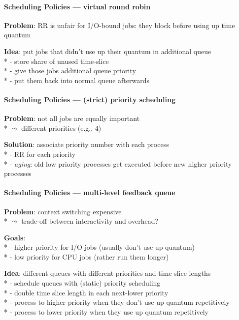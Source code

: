 \paragraph{Scheduling Policies --- virtual round robin}
\begin{items}
  \item \textbf{Problem}: RR is unfair for I/O-bound jobs: they block before using up time quantum
  \item \textbf{Idea}: put jobs that didn't use up their quantum in additional queue \\*
    - store share of unused time-slice \\*
    - give those jobs additional queue priority \\*
    - put them back into normal queue afterwards
\end{items}

\paragraph{Scheduling Policies --- (strict) priority scheduling}
\begin{items}
  \item \textbf{Problem}: not all jobs are equally important \\*
    \( \leadsto \) different priorities (e.g., 4)
  \item \textbf{Solution}: associate priority number with each process \\*
    - RR for each priority \\*
    - \emph{aging}: old low priority processes get executed before new higher priority processes
\end{items}

\paragraph{Scheduling Policies --- multi-level feedback queue}
\begin{items}
  \item \textbf{Problem}: context switching expensive \\*
    \( \leadsto \) trade-off between interactivity and overhead?
  \item \textbf{Goals}: \\*
    - higher priority for I/O jobs (usually don't use up quantum) \\*
    - low priority for CPU jobs (rather run them longer)
  \item \textbf{Idea}: different queues with different priorities and time slice lengths \\*
    - schedule queues with (static) priority scheduling \\*
    - double time slice length in each next-lower priority \\*
    - process to higher priority when they don't use up quantum repetitively \\*
    - process to lower priority when they use up quantum repetitively
\end{items}

